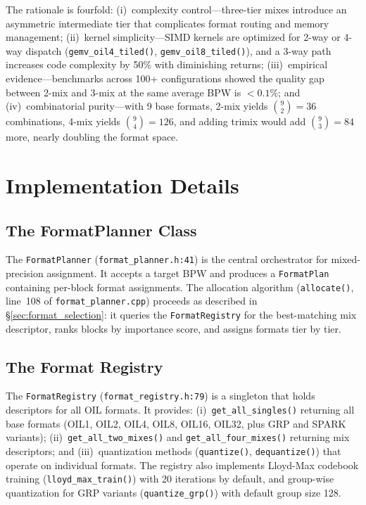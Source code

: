 The rationale is fourfold: (i)~complexity control---three-tier mixes
introduce an asymmetric intermediate tier that complicates format routing
and memory management; (ii)~kernel simplicity---SIMD kernels are
optimized for 2-way or 4-way dispatch (\texttt{gemv\_oil4\_tiled()},
\texttt{gemv\_oil8\_tiled()}), and a 3-way path increases code
complexity by 50\% with diminishing returns; (iii)~empirical
evidence---benchmarks across 100+ configurations showed the quality gap
between 2-mix and 3-mix at the same average BPW is $< 0.1\%$; and
(iv)~combinatorial purity---with 9 base formats, 2-mix yields
$\binom{9}{2} = 36$ combinations, 4-mix yields $\binom{9}{4} = 126$,
and adding trimix would add $\binom{9}{3} = 84$ more, nearly doubling
the format space.

\section{Implementation Details}
\label{sec:mix_implementation}

\subsection{The FormatPlanner Class}

The \texttt{FormatPlanner} (\texttt{format\_planner.h:41}) is the
central orchestrator for mixed-precision assignment.  It accepts a target
BPW and produces a \texttt{FormatPlan} containing per-block format
assignments.  The allocation algorithm (\texttt{allocate()}, line~108 of
\texttt{format\_planner.cpp}) proceeds as described in
\S\ref{sec:format_selection}: it queries the \texttt{FormatRegistry}
for the best-matching mix descriptor, ranks blocks by importance score,
and assigns formats tier by tier.

\subsection{The Format Registry}

The \texttt{FormatRegistry} (\texttt{format\_registry.h:79}) is a
singleton that holds descriptors for all OIL formats.  It provides:
(i)~\texttt{get\_all\_singles()} returning all base formats (OIL1,
OIL2, OIL4, OIL8, OIL16, OIL32, plus GRP and SPARK variants);
(ii)~\texttt{get\_all\_two\_mixes()} and
\texttt{get\_all\_four\_mixes()} returning mix descriptors; and
(iii)~quantization methods (\texttt{quantize()}, \texttt{dequantize()})
that operate on individual formats.  The registry also implements
Lloyd-Max codebook training (\texttt{lloyd\_max\_train()}) with 20
iterations by default, and group-wise quantization for GRP variants
(\texttt{quantize\_grp()}) with default group size 128.

